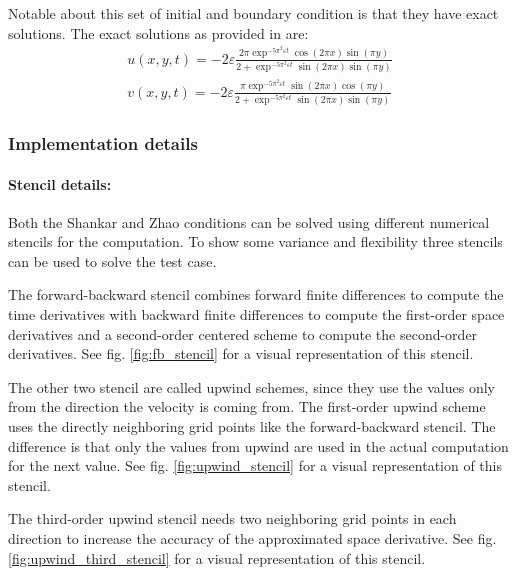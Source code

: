 Notable about this set of initial and boundary condition is that they have exact solutions.
The exact solutions as provided in \citet{zhao2011new} are:
\\
\begin{equation}
\begin{split}
u\left(x,y,t\right) = -2\varepsilon \frac{2 \pi \exp^{-5 \pi^2 \varepsilon t} \cos\left(2 \pi x\right) \sin\left(\pi y\right)}{2 + \exp^{-5 \pi^2 \varepsilon t}\sin\left(2 \pi x\right) \sin\left(\pi y\right)}
\\
v\left(x,y,t\right) = -2\varepsilon \frac{\pi \exp^{-5 \pi^2 \varepsilon t} \sin\left(2 \pi x\right) \cos\left(\pi y\right)}{2 + \exp^{-5 \pi^2 \varepsilon t}\sin\left(2 \pi x\right) \sin\left(\pi y\right)}
\end{split}
\end{equation}

\subsubsection{Implementation details}
\paragraph{Stencil details: }
Both the Shankar and Zhao conditions can be solved using different numerical stencils for the computation.
To show some variance and flexibility three stencils can be used to solve the test case.

The forward-backward stencil combines forward finite differences to compute the time derivatives with backward finite differences to compute the first-order space derivatives and a second-order centered scheme to compute the second-order derivatives.
See fig. \ref{fig:fb_stencil} for a visual representation of this stencil.

The other two stencil are called upwind schemes, since they use the values only from the direction the velocity is coming from.
The first-order upwind scheme uses the directly neighboring grid points like the forward-backward stencil.
The difference is that only the values from upwind are used in the actual computation for the next value.
See fig. \ref{fig:upwind_stencil} for a visual representation of this stencil.

The third-order upwind stencil needs two neighboring grid points in each direction to increase the accuracy of the approximated space derivative.
See fig. \ref{fig:upwind_third_stencil} for a visual representation of this stencil.

